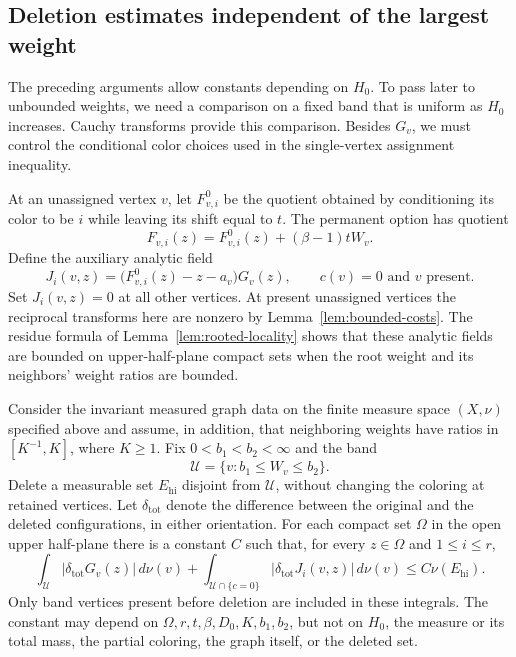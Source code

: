 \subsection{Deletion estimates independent of the largest weight}

The preceding arguments allow constants depending on $H_0$.  To pass later
to unbounded weights, we need a comparison on a fixed band that is uniform
as $H_0$ increases.  Cauchy transforms provide this comparison.  Besides
$G_v$, we must control the conditional color choices used in the
single-vertex assignment inequality.

At an unassigned vertex $v$, let $F_{v,i}^0$ be the quotient obtained by
conditioning its color to be $i$ while leaving its shift equal to $t$.
The permanent option has quotient
\[
 F_{v,i}(z)=F_{v,i}^0(z)+(\beta-1)tW_v.
\]
Define the auxiliary analytic field
\begin{equation}\label{inv:J-definition}
 J_i(v,z)=\bigl(F_{v,i}^0(z)-z-a_v\bigr)G_v(z),
       \qquad c(v)=0\text{ and }v\text{ present}.
\end{equation}
Set $J_i(v,z)=0$ at all other vertices. At present unassigned vertices the reciprocal transforms here are nonzero by
Lemma~\ref{lem:bounded-costs}.  The residue formula of
Lemma~\ref{lem:rooted-locality} shows that these analytic fields are
bounded on upper-half-plane compact sets when the root weight and its
neighbors' weight ratios are bounded.

\begin{lemma}\label{lem:rank-comparison}
Consider the invariant measured graph data on the finite measure space
$(X,\nu)$ specified above and assume, in addition, that neighboring
weights have ratios in $[K^{-1},K]$, where
$K\geq1$.  Fix $0<b_1<b_2<\infty$ and the band
\[
 \mathcal U=\{v:b_1\leq W_v\leq b_2\}.
\]
Delete a measurable set $E_{\mathrm{hi}}$ disjoint from $\mathcal U$, without
changing the coloring at retained vertices.  Let $\delta_{\mathrm{tot}}$
denote the difference between the original and the deleted configurations,
in either orientation.  For each compact set $\Omega$ in the open upper
half-plane there is a constant $C$ such that, for every $z\in\Omega$ and
$1\leq i\leq r$,
\begin{equation}\label{inv:rank-comparison}
 \int_{\mathcal U}|\delta_{\mathrm{tot}}G_v(z)|\,d\nu(v)
 +\int_{\mathcal U\cap\{c=0\}}
       |\delta_{\mathrm{tot}}J_i(v,z)|\,d\nu(v)
 \leq C\nu(E_{\mathrm{hi}}).
\end{equation}
Only band vertices present before deletion are included in these integrals.
The constant may depend on $\Omega,r,t,\beta,D_0,K,b_1,b_2$, but not on
$H_0$, the measure or its total mass, the partial coloring, the graph
itself, or the deleted set.
\end{lemma}

